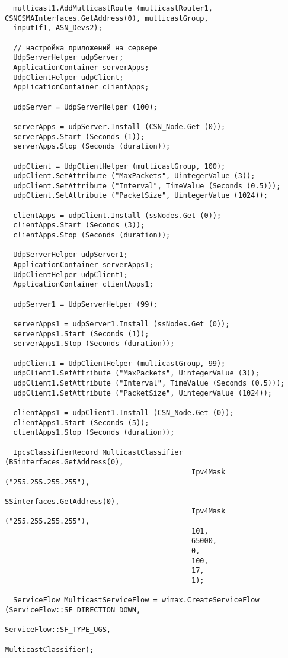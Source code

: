 \documentclass[14pt,a4paper]{article}
\begin{document}
{\begin{verbatim}
  multicast1.AddMulticastRoute (multicastRouter1, CSNCSMAInterfaces.GetAddress(0), multicastGroup, 
  inputIf1, ASN_Devs2);

  // настройка приложений на сервере
  UdpServerHelper udpServer;
  ApplicationContainer serverApps;
  UdpClientHelper udpClient;
  ApplicationContainer clientApps;

  udpServer = UdpServerHelper (100);

  serverApps = udpServer.Install (CSN_Node.Get (0));
  serverApps.Start (Seconds (1));
  serverApps.Stop (Seconds (duration));

  udpClient = UdpClientHelper (multicastGroup, 100);
  udpClient.SetAttribute ("MaxPackets", UintegerValue (3));
  udpClient.SetAttribute ("Interval", TimeValue (Seconds (0.5)));
  udpClient.SetAttribute ("PacketSize", UintegerValue (1024));

  clientApps = udpClient.Install (ssNodes.Get (0));
  clientApps.Start (Seconds (3));
  clientApps.Stop (Seconds (duration));

  UdpServerHelper udpServer1;
  ApplicationContainer serverApps1;
  UdpClientHelper udpClient1;
  ApplicationContainer clientApps1;

  udpServer1 = UdpServerHelper (99);

  serverApps1 = udpServer1.Install (ssNodes.Get (0));
  serverApps1.Start (Seconds (1));
  serverApps1.Stop (Seconds (duration));

  udpClient1 = UdpClientHelper (multicastGroup, 99);
  udpClient1.SetAttribute ("MaxPackets", UintegerValue (3));
  udpClient1.SetAttribute ("Interval", TimeValue (Seconds (0.5)));
  udpClient1.SetAttribute ("PacketSize", UintegerValue (1024));

  clientApps1 = udpClient1.Install (CSN_Node.Get (0));
  clientApps1.Start (Seconds (5));
  clientApps1.Stop (Seconds (duration));

  IpcsClassifierRecord MulticastClassifier (BSinterfaces.GetAddress(0),
                                            Ipv4Mask ("255.255.255.255"),
                                            SSinterfaces.GetAddress(0),
                                            Ipv4Mask ("255.255.255.255"),
                                            101,
                                            65000,
                                            0,
                                            100,
                                            17,
                                            1);

  ServiceFlow MulticastServiceFlow = wimax.CreateServiceFlow (ServiceFlow::SF_DIRECTION_DOWN,
                                                              ServiceFlow::SF_TYPE_UGS,
                                                              MulticastClassifier);


\end{verbatim}}
\end{document}
